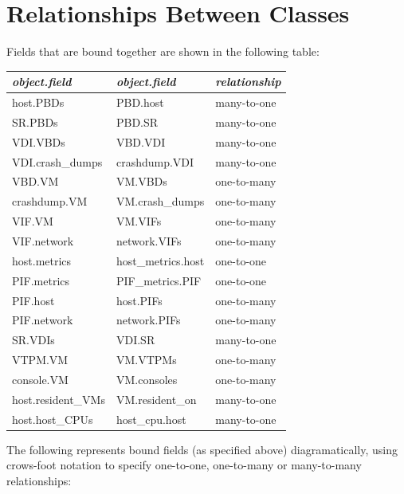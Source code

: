 \section{Relationships Between Classes}
Fields that are bound together are shown in the following table: 
\begin{center}\begin{tabular}{|ll|l|}
\hline
{\em object.field} & {\em object.field} & {\em relationship} \\

\hline
host.PBDs & PBD.host & many-to-one\\
SR.PBDs & PBD.SR & many-to-one\\
VDI.VBDs & VBD.VDI & many-to-one\\
VDI.crash\_dumps & crashdump.VDI & many-to-one\\
VBD.VM & VM.VBDs & one-to-many\\
crashdump.VM & VM.crash\_dumps & one-to-many\\
VIF.VM & VM.VIFs & one-to-many\\
VIF.network & network.VIFs & one-to-many\\
host.metrics & host\_metrics.host & one-to-one\\
PIF.metrics & PIF\_metrics.PIF & one-to-one\\
PIF.host & host.PIFs & one-to-many\\
PIF.network & network.PIFs & one-to-many\\
SR.VDIs & VDI.SR & many-to-one\\
VTPM.VM & VM.VTPMs & one-to-many\\
console.VM & VM.consoles & one-to-many\\
host.resident\_VMs & VM.resident\_on & many-to-one\\
host.host\_CPUs & host\_cpu.host & many-to-one\\
\hline
\end{tabular}\end{center}

The following represents bound fields (as specified above) diagramatically, using crows-foot notation to specify one-to-one, one-to-many or many-to-many
                   relationships:

\begin{center}\end{center}
\
